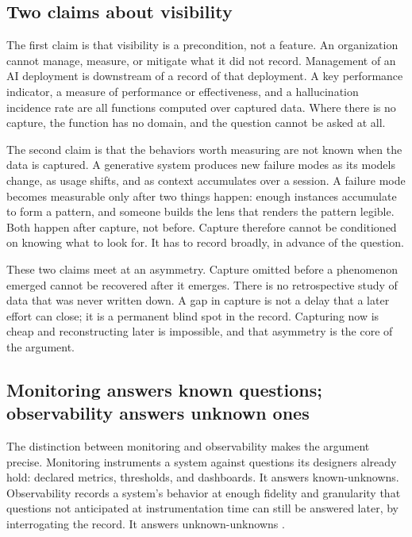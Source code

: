 \documentclass[11pt]{article}
\begin{document}
\subsection{Two claims about visibility}

The first claim is that visibility is a precondition, not a feature. An
organization cannot manage, measure, or mitigate what it did not record.
Management of an AI deployment is downstream of a record of that deployment. A
key performance indicator, a measure of performance or effectiveness, and a
hallucination incidence rate are all functions computed over captured data.
Where there is no capture, the function has no domain, and the question cannot
be asked at all.

The second claim is that the behaviors worth measuring are not known when the
data is captured. A generative system produces new failure modes as its models
change, as usage shifts, and as context accumulates over a session. A failure
mode becomes measurable only after two things happen: enough instances
accumulate to form a pattern, and someone builds the lens that renders the
pattern legible. Both happen after capture, not before. Capture therefore
cannot be conditioned on knowing what to look for. It has to record broadly, in
advance of the question.

These two claims meet at an asymmetry. Capture omitted before a phenomenon
emerged cannot be recovered after it emerges. There is no retrospective study of
data that was never written down. A gap in capture is not a delay that a later
effort can close; it is a permanent blind spot in the record. Capturing now is
cheap and reconstructing later is impossible, and that asymmetry is the core of
the argument.

\subsection{Monitoring answers known questions; observability answers unknown ones}

The distinction between monitoring and observability makes the argument precise.
Monitoring instruments a system against questions its designers already hold:
declared metrics, thresholds, and dashboards. It answers known-unknowns.
Observability records a system's behavior at enough fidelity and granularity
that questions not anticipated at instrumentation time can still be answered
later, by interrogating the record. It answers unknown-unknowns
\cite{majors2022observability}.
\end{document}

